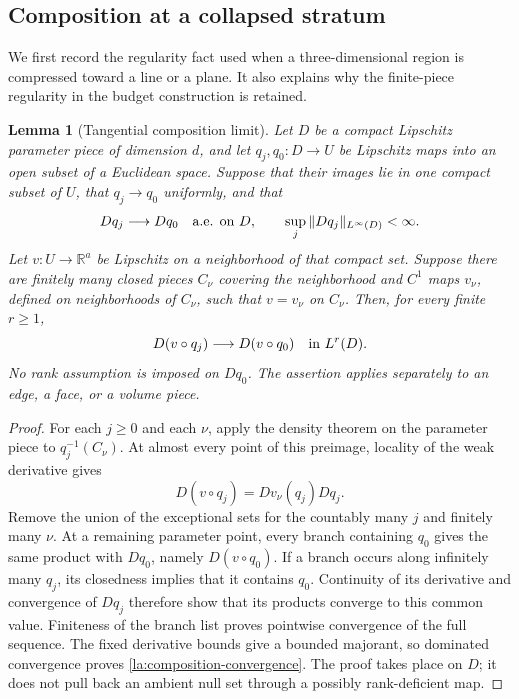 \documentclass[11pt]{article}
\numberwithin{equation}{section}
\newtheorem{lemma}[theorem]{Lemma}
\theoremstyle{definition}
\theoremstyle{remark}
\newcommand{\R}{\mathbb R}
\begin{document}
\subsection{Composition at a collapsed stratum}

We first record the regularity fact used when a three-dimensional
region is compressed toward a line or a plane.  It also explains why
the finite-piece regularity in the budget construction is retained.

\begin{lemma}[Tangential composition limit]\label{la:composition-limit}
Let $D$ be a compact Lipschitz parameter piece of dimension $d$, and let
$q_j,q_0:D\to U$ be Lipschitz maps into an open subset of a Euclidean
space.  Suppose that their images lie in one compact subset of $U$,
that $q_j\to q_0$ uniformly, and that
\[
 Dq_j\longrightarrow Dq_0\quad\hbox{a.e. on }D,
 \qquad \sup_j\|Dq_j\|_{L^\infty(D)}<\infty.
\]
Let $v:U\to\R^a$ be Lipschitz on a neighborhood of that compact set.
Suppose there are finitely many closed pieces $C_\nu$ covering the
neighborhood and $C^1$ maps $v_\nu$, defined on neighborhoods of
$C_\nu$, such that $v=v_\nu$ on $C_\nu$.  Then, for every finite
$r\ge1$,
\begin{equation}\label{la:composition-convergence}
 D(v\circ q_j)\longrightarrow D(v\circ q_0)
       \quad\hbox{in }L^r(D).
\end{equation}
No rank assumption is imposed on $Dq_0$.  The assertion applies
separately to an edge, a face, or a volume piece.
\end{lemma}

\begin{proof}
For each $j\ge0$ and each $\nu$, apply the density theorem on the
parameter piece to $q_j^{-1}(C_\nu)$.  At almost every point of this
preimage, locality of the weak derivative gives
\[
 D(v\circ q_j)=Dv_\nu(q_j)Dq_j.
\]
Remove the union of the exceptional sets for the countably many $j$
and finitely many $\nu$.  At a remaining parameter point, every branch
containing $q_0$ gives the same product with $Dq_0$, namely
$D(v\circ q_0)$.  If a branch occurs along infinitely many $q_j$, its
closedness implies that it contains $q_0$.  Continuity of its
derivative and convergence of $Dq_j$ therefore show that its products
converge to this common value.  Finiteness of the branch list proves
pointwise convergence of the full sequence.  The fixed derivative
bounds give a bounded majorant, so dominated convergence proves
\eqref{la:composition-convergence}.  The proof takes place on $D$;
it does not pull back an ambient null set through a possibly
rank-deficient map.
\end{proof}
\end{document}
